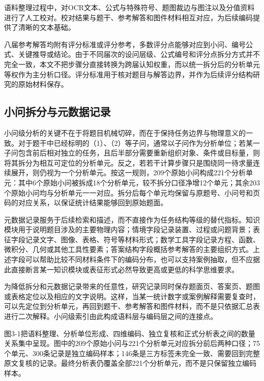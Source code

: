 \documentclass[
  12pt,
  a4paper,twoside,openany]{ctexbook}
\begin{document}
语料整理过程中，对OCR文本、公式与特殊符号、题图裁边与图注以及分值资料进行了人工校对。校对结果与题干、参考解答和图件材料相互对应，为后续编码提供了清晰的文本基础。

八届参考解答均附有评分标准或评分参考，多数评分点能够对应到小问、编号公式、关键推导或结论。由于不同届次的设问层级、公式编号和评分点拆分方式并不完全一致，本文不把步骤分直接转换为跨届认知权重，而以统一拆分后的分析单元等权作为主分析口径。评分标准用于核对题目与解答边界，并作为后续评分结构研究的原始材料保存。

\subsection{小问拆分与元数据记录}\label{ux5c0fux95eeux62c6ux5206ux4e0eux5143ux6570ux636eux8bb0ux5f55}

小问级分析的关键不在于将题目机械切碎，而在于保持任务边界与物理意义的一致。对于题干中已经标明的（1）、（2）等子问，通常以子问作为分析单位；若某一子问包含前后相对独立的任务，且后半部分需要重新组织对象、条件或目标量，则将其拆分为相互可定位的分析单元。反之，若若干计算步骤只是围绕同一待求量连续展开，则仍视为一个分析单元。按这一规则，209个原始小问构成221个分析单元：其中6个原始小问被拆成18个分析单元，较不拆分口径净增12个单元；其余203个原始小问均与分析单元一一对应。拆分后每个单元均保留与原题号、小问号和页码的对应关系，以保证统计结果能够回到原始题面。

元数据记录服务于后续检索和描述，而不直接作为任务结构等级的替代指标。知识模块用于说明题目涉及的主要物理内容；情境字段记录装置、过程或问题背景；表征字段记录文字、图像、表格、符号等材料形式；数学工具字段记录方程、函数、微积分、几何或其他工具性要素；答案结构字段概括参考解答的主要组织方式。上述字段可以帮助比较不同材料条件下的编码分布，也可以支持案例抽取，但不应据此直接断言某一知识模块或表征形式必然导致更高或更低的科学思维要求。

为降低拆分和元数据记录带来的任意性，研究记录同时保存题面页、答案页、题图或表格定位以及相应的文字说明。这样，当某一统计数字或案例解释需要复查时，可以先定位到分析单元，再回到题干、参考解答和图件材料，而不是只依据汇总表进行二次解释。小问级索引由此构成语料层与编码层之间的连接点。

图3-1把语料整理、分析单位形成、四维编码、独立复核和正式分析表之间的数量关系集中呈现。图中的209个原始小问与221个分析单元对应拆分前后两种口径；75个单元、300条记录是独立编码样本；146条是三方标签未完全一致、需要回到完整原文复核的记录。最终分析表仍覆盖全部221个分析单元，而不是只保留独立编码样本。
\end{document}
